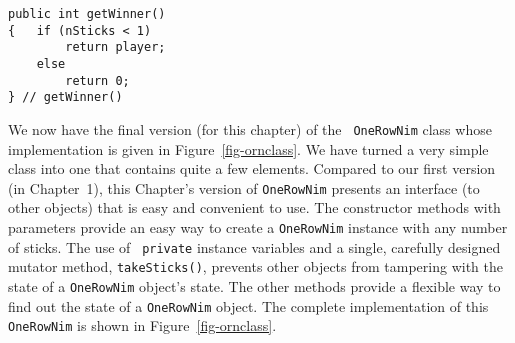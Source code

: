 \begin{jjjlisting}
\begin{lstlisting}
public int getWinner()
{   if (nSticks < 1)
        return player;
    else 
        return 0;
} // getWinner()
\end{lstlisting}
\end{jjjlisting}

We now have the final version (for this chapter) of the {\tt
OneRowNim} class whose implementation is given in
Figure~\ref{fig-ornclass}.  We have turned a very simple class into
one that contains quite a few elements.  Compared to our first version
(in Chapter~1), this Chapter's version of {\tt OneRowNim} presents an
interface (to other objects) that is easy and convenient to use.  The
constructor methods with parameters provide an easy way to create a
{\tt OneRowNim} instance with any number of sticks.  The use of {\tt
private} instance variables and a single, carefully designed mutator
method, {\tt takeSticks()}, prevents other objects from tampering with
the state of a {\tt OneRowNim} object's state.  The other methods
provide a flexible way to find out the state of a {\tt OneRowNim}
object.  The complete implementation of this {\tt OneRowNim} is shown
in Figure~\ref{fig-ornclass}.

